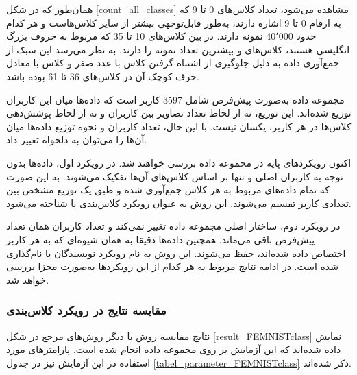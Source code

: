 همان‌طور که در شکل
\ref{count_all_classes}
مشاهده می‌شود، تعداد کلاس‌های 0 تا 9 که به ارقام 0 تا 9 اشاره دارند، به‌طور قابل‌توجهی بیشتر از سایر کلاس‌هاست و هر کدام حدود 40٬000 نمونه دارند. در بین کلاس‌های 10 تا 35 که مربوط به حروف بزرگ انگلیسی هستند، کلاس‌های  و  بیشترین تعداد نمونه را دارند. به نظر می‌رسد این سبک از جمع‌آوری داده به دلیل جلوگیری از اشتباه گرفتن کلاس  با عدد صفر و کلاس  با معادل حرف کوچک آن در کلاس‌های 36 تا 61 بوده باشد.


مجموعه داده
به‌صورت پیش‌فرض شامل 3597 کاربر است که داده‌ها میان این کاربران توزیع شده‌اند. این توزیع، نه از لحاظ تعداد تصاویر بین کاربران و نه از لحاظ پوشش‌دهی کلاس‌ها در هر کاربر، یکسان نیست. با این حال، تعداد کاربران و نحوه توزیع داده‌ها میان آن‌ها را می‌توان به دلخواه تغییر داد.



اکنون رویکردهای پایه در مجموعه داده
بررسی خواهند شد. در رویکرد اول، داده‌ها بدون توجه به کاربران اصلی و تنها بر اساس کلاس‌های آن‌ها تفکیک می‌شوند. به این صورت که تمام داده‌های مربوط به هر کلاس جمع‌آوری شده و طبق یک توزیع مشخص بین تعدادی کاربر تقسیم می‌شوند. این روش به عنوان رویکرد کلاس‌بندی یا
شناخته می‌شود.

در رویکرد دوم، ساختار اصلی مجموعه داده تغییر نمی‌کند و تعداد کاربران همان تعداد پیش‌فرض باقی می‌ماند. همچنین داده‌ها دقیقا به همان شیوه‌ای که به هر کاربر اختصاص داده شده‌اند، حفظ می‌شوند. این روش به نام رویکرد نویسندگان یا
نام‌گذاری شده است. در ادامه نتایج مربوط به هر کدام از این رویکرد‌ها به‌صورت مجزا بررسی خواهد شد.






\subsubsection{
	مقایسه نتایج در رویکرد کلاس‌بندی
}

نتایج مقایسه روش
با دیگر روش‌های مرجع در شکل
\ref{result_FEMNISTclass}
نمایش داده شده‌اند که این آزمایش بر روی مجموعه داده
انجام شده است. پارامترهای مورد استفاده در این آزمایش نیز در جدول
\ref{tabel_parameter_FEMNISTclass}
ذکر شده‌اند.


